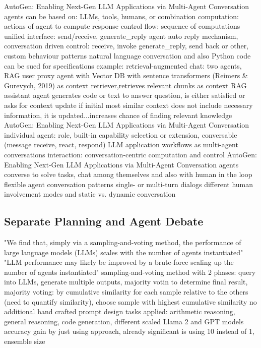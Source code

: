 \documentclass{article}
\begin{document}
\cite{wu_autogen_2023} AutoGen: Enabling Next-Gen LLM Applications via Multi-Agent Conversation
agents can be based on: LLMs, tools, humans, or combination
computation: actions of agent to compute response
control flow: sequence of computations
unified interface: send/receive, generate\_reply
agent auto reply mechanism, conversation driven control: receive, invoke generate\_reply, send back
or other, custom behaviour patterns
natural language conversation and also Python code can be sued for specifications
example: retrieval-augmented chat: two agents, RAG user proxy agent with Vector DB with sentence transformers (Reimers \& Gurevych, 2019) as context retriever,retrieves relevant chunks as context RAG assistant agent generates code or text to answer question, is either satisfied or asks for context update
if initial most similar context does not include necessary information, it is updated...increases chance of finding relevant knowledge
\cite{wu_autogen_2023} AutoGen: Enabling Next-Gen LLM Applications via Multi-Agent Conversation
individual agent: role, built-in capability selection or extension, conversable (message receive, react, respond)
LLM application workflows as multi-agent conversations
interaction: conversation-centric computation and control
\cite{wu_autogen_2023} AutoGen: Enabling Next-Gen LLM Applications via Multi-Agent Conversation
agents converse to solve tasks, chat among themselves and also with human in the loop
flexible agent conversation patterns
single- or multi-turn dialogs
different human involvement modes
and static vs. dynamic conversation

\subsection{Separate Planning and Agent Debate}

\cite{li_more_2024}
"We find that, simply via a sampling-and-voting method, the performance of large language models (LLMs) scales with the number of agents instantiated"
"LLM performance may likely be improved by a brute-force scaling up the number of agents instantiated"
sampling-and-voting method with 2 phases: query into LLMs, generate multiple outputs, majority votin to determine final result, majority voting: by cumulative similarity for each sample relative to the others (need to quantify similarity), choose sample with highest cumulative similarity
no additional hand crafted prompt design
tasks applied: arithmetic reasoning, general reasoning, code generation, different scaled Llama 2 and GPT models
accuracy gain by just using approach, already significant is using 10 instead of 1, ensemble size
\end{document}
